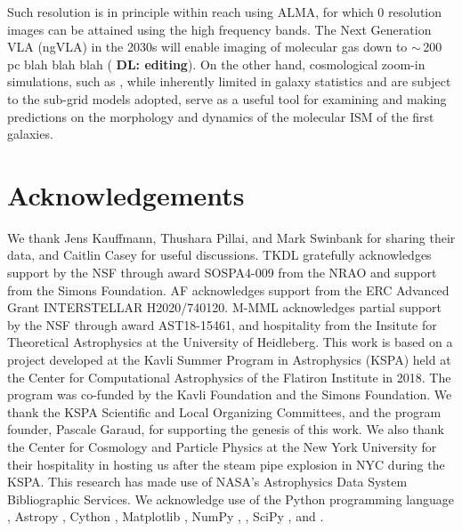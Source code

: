 \IfFileExists{emulateapjlegacy.cls}{\documentclass[iop]{emulateapjlegacy}}{\documentclass[iop]{emulateapj}}
\newcommand{\DL}[1]{({\bf \color{dlcolor} DL: #1})}
\begin{document}
Such resolution is in principle within reach using ALMA, for which 0 resolution images can be attained using the high frequency bands. 
The Next Generation VLA (ngVLA) in the 2030s will enable imaging of molecular gas down to $\sim$\,200\,pc \citep{Casey18a} blah blah blah \DL{editing}.
On the other hand, cosmological zoom-in simulations, such as , while inherently limited in galaxy statistics and are subject to the sub-grid models adopted, serve as a useful tool for examining and making predictions on the morphology and dynamics of the molecular ISM of the first galaxies.



\section*{Acknowledgements}
We thank Jens Kauffmann, Thushara Pillai, and Mark Swinbank for sharing their data, and Caitlin Casey for useful discussions.
%
TKDL gratefully acknowledges support by the NSF through award SOSPA4-009 from the NRAO and support from the Simons Foundation.
%
AF acknowledges support from the ERC Advanced Grant INTERSTELLAR
H2020/740120.
M-MML acknowledges partial support by the NSF through award
AST18-15461, and hospitality from the Insitute for Theoretical
Astrophysics at the University of Heidleberg.
%
This work is based on a project developed at the Kavli Summer Program in Astrophysics (KSPA) held at the Center for Computational Astrophysics of the Flatiron Institute in 2018. The program was co-funded by the Kavli Foundation and the Simons Foundation.
%
We thank the KSPA Scientific and Local Organizing Committees, and the program founder, Pascale Garaud, for supporting the genesis of this work.
%
We also thank the Center for Cosmology and Particle Physics at the New York University for their hospitality in hosting us after the steam pipe explosion in NYC during the KSPA.
%
This research has made use of NASA's Astrophysics Data System Bibliographic Services.
%
We acknowledge use of the Python programming language \citep{VanRossum1991}, Astropy \citep{astropy}, Cython \citep{behnel2010cython}, Matplotlib \citep{Hunter2007}, NumPy \citep{VanDerWalt2011},  \citep{Labadens2012}, SciPy \citep{scipyref}, and  \citep{Smith09a,Turk11a}.
%



\end{document}
